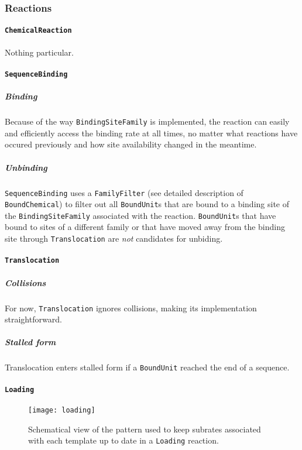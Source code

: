 
\subsubsection{Reactions}

\paragraph{\texttt{ChemicalReaction}}

Nothing particular.

\paragraph{\texttt{SequenceBinding}}

\subparagraph{Binding} Because of the way \texttt{BindingSiteFamily} is implemented, the reaction can easily and efficiently access the binding rate at all times, no matter what reactions have occured previously and how site availability changed in the meantime.

\subparagraph{Unbinding} \texttt{SequenceBinding} uses a \texttt{FamilyFilter} (see detailed description of \texttt{BoundChemical}) to filter out all \texttt{BoundUnit}s that are bound to a binding site of the \texttt{BindingSiteFamily} associated with the reaction. \texttt{BoundUnit}s that have bound to sites of a different family or that have moved away from the binding site through \texttt{Translocation} are \emph{not} candidates for unbiding.

\paragraph{\texttt{Translocation}}

\subparagraph{Collisions} For now, \texttt{Translocation} ignores collisions, making its implementation straightforward.

\subparagraph{Stalled form} Translocation enters stalled form if a \texttt{BoundUnit} reached the end of a sequence.

\paragraph{\texttt{Loading}}

\begin{figure}[!h]
  \centering
  \texttt{[image: loading]}
  \caption{Schematical view of the pattern used to keep subrates associated with each template up to date in a \texttt{Loading} reaction.}
  \label{fig:det_loading}
\end{figure}


